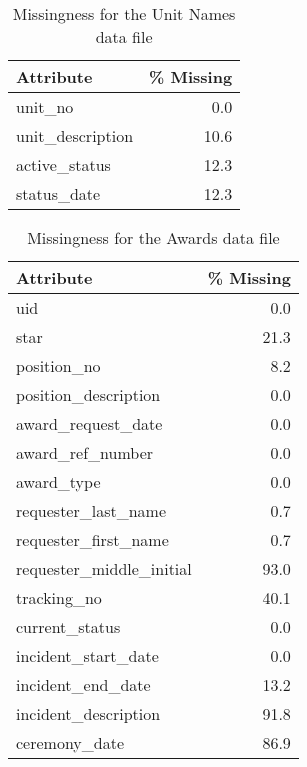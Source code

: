 \begin{table}[t!]
\caption{Missingness for the Unit Names data file}
\centering 
\begin{tabular}{lr}
\toprule
       Attribute &  \% Missing \\
\midrule
         unit\_no &        0.0 \\
unit\_description &       10.6 \\
   active\_status &       12.3 \\
     status\_date &       12.3 \\
\bottomrule
\end{tabular}
\end{table}


\begin{table}[t!]
\caption{Missingness for the Awards data file}
\centering 
\begin{tabular}{lr}
\toprule
               Attribute &  \% Missing \\
\midrule
                     uid &        0.0 \\
                    star &       21.3 \\
             position\_no &        8.2 \\
    position\_description &        0.0 \\
      award\_request\_date &        0.0 \\
        award\_ref\_number &        0.0 \\
              award\_type &        0.0 \\
     requester\_last\_name &        0.7 \\
    requester\_first\_name &        0.7 \\
requester\_middle\_initial &       93.0 \\
             tracking\_no &       40.1 \\
          current\_status &        0.0 \\
     incident\_start\_date &        0.0 \\
       incident\_end\_date &       13.2 \\
    incident\_description &       91.8 \\
           ceremony\_date &       86.9 \\
\bottomrule
\end{tabular}
\end{table}

